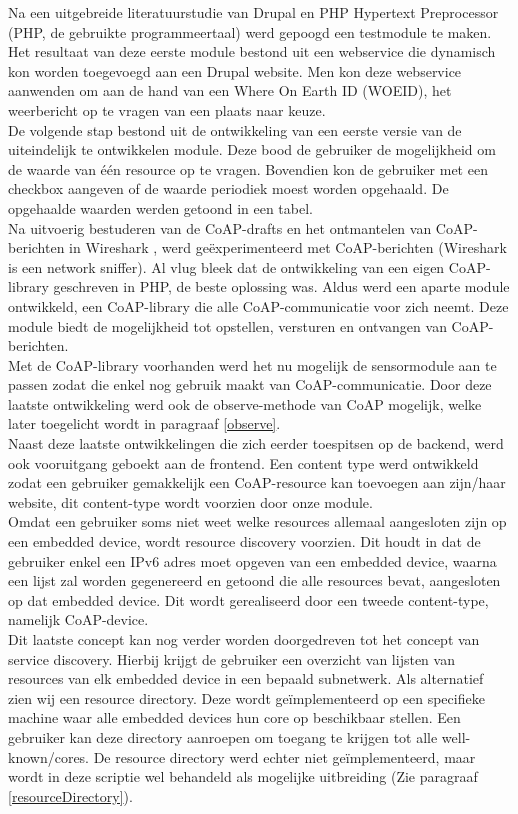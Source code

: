 Na een uitgebreide literatuurstudie van Drupal en PHP Hypertext Preprocessor (PHP, de gebruikte programmeertaal) werd gepoogd een testmodule te maken. Het resultaat van deze eerste module bestond uit een webservice die dynamisch kon worden toegevoegd aan een Drupal website. Men kon deze webservice aanwenden om aan de hand van een Where On Earth ID (WOEID), het weerbericht op te vragen van een plaats naar keuze.\\
De volgende stap bestond uit de ontwikkeling van een eerste versie van de uiteindelijk te ontwikkelen module. Deze bood de gebruiker de mogelijkheid om de waarde van \'{e}\'{e}n resource op te vragen. Bovendien kon de gebruiker met een checkbox aangeven of de waarde periodiek moest worden opgehaald. De opgehaalde waarden werden getoond in een tabel.\\
Na uitvoerig bestuderen van de CoAP-drafts en het ontmantelen van CoAP-berichten in Wireshark \cite{wireshark}, werd ge\"{e}xperimenteerd met CoAP-berichten (Wireshark is een network sniffer). Al vlug bleek dat de ontwikkeling van een eigen CoAP-library geschreven in PHP, de beste oplossing was. Aldus werd een aparte module ontwikkeld, een CoAP-library die alle CoAP-communicatie voor zich neemt. Deze module biedt de mogelijkheid tot opstellen, versturen en ontvangen van CoAP-berichten.\\
Met de CoAP-library voorhanden werd het nu mogelijk de sensormodule aan te passen zodat die enkel nog gebruik maakt van CoAP-communicatie. Door deze laatste ontwikkeling werd ook de observe-methode van CoAP mogelijk, welke later toegelicht wordt in paragraaf \ref{observe}.\\
Naast deze laatste ontwikkelingen die zich eerder toespitsen op de backend, werd ook vooruitgang geboekt aan de frontend. Een content type werd ontwikkeld zodat een gebruiker gemakkelijk een CoAP-resource kan toevoegen aan zijn/haar website, dit content-type wordt voorzien door onze module.\\
Omdat een gebruiker soms niet weet welke resources allemaal aangesloten zijn op een embedded device, wordt resource discovery voorzien. Dit houdt in dat de gebruiker enkel een IPv6 adres moet opgeven van een embedded device, waarna een lijst zal worden gegenereerd en getoond die alle resources bevat, aangesloten op dat embedded device. Dit wordt gerealiseerd door een tweede content-type, namelijk CoAP-device.\\
Dit laatste concept kan nog verder worden doorgedreven tot het concept van service discovery. Hierbij krijgt de gebruiker een overzicht van lijsten van resources van elk embedded device in een bepaald subnetwerk. Als alternatief zien wij een resource directory. Deze wordt ge\"{i}mplementeerd op een specifieke machine waar alle embedded devices hun core op beschikbaar stellen. Een gebruiker kan deze directory aanroepen om toegang te krijgen tot alle well-known/cores. De resource directory werd echter niet geïmplementeerd, maar wordt in deze scriptie wel behandeld als mogelijke uitbreiding (Zie paragraaf \ref{resourceDirectory}).\\
